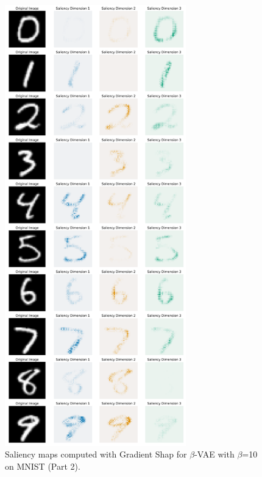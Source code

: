 \begin{figure}[h]
\centering
    \includegraphics[width=0.7\textwidth]{images/vae/beta_vae_10_sms_mnist_2.PNG}
\caption{Saliency maps computed with Gradient Shap for $\beta$-VAE with  $\beta$=10 on MNIST (Part 2).}\label{fig:betavae10smsmnist2}
\end{figure}

\clearpage
